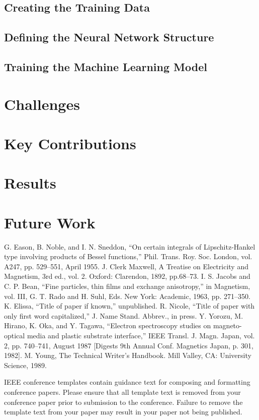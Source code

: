 \documentclass[11pt,conference]{IEEEtran}
\begin{document}
\subsection{Creating the Training Data}


\subsection{Defining the Neural Network Structure}

\subsection{Training the Machine Learning Model}

\section{Challenges}

\section{Key Contributions}

\section{Results}


\section{Future Work}


\begin{thebibliography}{00}
     G. Eason, B. Noble, and I. N. Sneddon, ``On certain integrals of Lipschitz-Hankel type involving products of Bessel functions,'' Phil. Trans. Roy. Soc. London, vol. A247, pp. 529--551, April 1955.
     J. Clerk Maxwell, A Treatise on Electricity and Magnetism, 3rd ed., vol. 2. Oxford: Clarendon, 1892, pp.68--73.
     I. S. Jacobs and C. P. Bean, ``Fine particles, thin films and exchange anisotropy,'' in Magnetism, vol. III, G. T. Rado and H. Suhl, Eds. New York: Academic, 1963, pp. 271--350.
     K. Elissa, ``Title of paper if known,'' unpublished.
     R. Nicole, ``Title of paper with only first word capitalized,'' J. Name Stand. Abbrev., in press.
     Y. Yorozu, M. Hirano, K. Oka, and Y. Tagawa, ``Electron spectroscopy studies on magneto-optical media and plastic substrate interface,'' IEEE Transl. J. Magn. Japan, vol. 2, pp. 740--741, August 1987 [Digests 9th Annual Conf. Magnetics Japan, p. 301, 1982].
     M. Young, The Technical Writer's Handbook. Mill Valley, CA: University Science, 1989.
\end{thebibliography}
\vspace{12pt}
\color{red}
IEEE conference templates contain guidance text for composing and formatting conference papers. Please ensure that all template text is removed from your conference paper prior to submission to the conference. Failure to remove the template text from your paper may result in your paper not being published.
\end{document}
